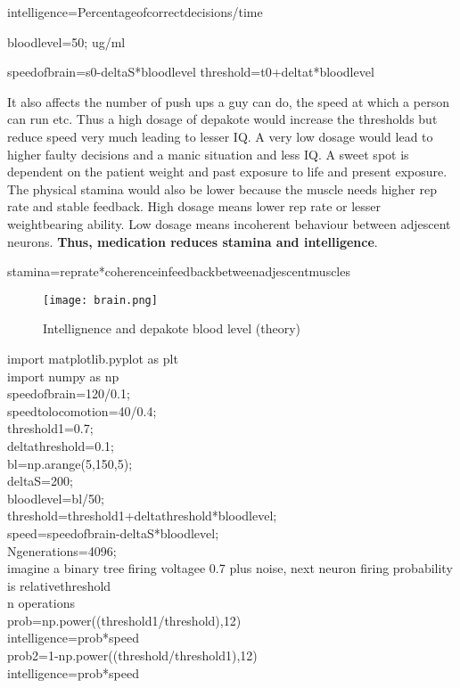 \documentclass[a4paper]{article}
\begin{document}
intelligence=Percentageofcorrectdecisions/time

bloodlevel=50; ug/ml

speedofbrain=s0-deltaS*bloodlevel
threshold=t0+deltat*bloodlevel

It also affects the number of push ups a guy can do, the speed at which  a person can run etc. Thus a high dosage of depakote would increase the thresholds but reduce speed very much leading to lesser IQ. A very low dosage would lead to higher faulty decisions and a manic situation and less IQ. A sweet spot is dependent on the patient weight and past exposure to life and present exposure. The physical stamina would also be lower because the muscle needs higher rep rate and stable feedback. High dosage means lower rep rate or lesser weightbearing ability. Low dosage means incoherent behaviour between adjescent neurons. \textbf{Thus, medication reduces stamina and intelligence}.

stamina=reprate*coherenceinfeedbackbetweenadjescentmuscles

 

\begin{figure}
\centering
\texttt{[image: brain.png]}
\caption{\label{fig:Lorenz}Intellignence and depakote blood level (theory)}
\end{figure}

import matplotlib.pyplot as plt\\
import numpy as np\\
speedofbrain=120/0.1;\\
speedtolocomotion=40/0.4;\\
threshold1=0.7;\\
deltathreshold=0.1;\\
bl=np.arange(5,150,5);\\
deltaS=200;\\
bloodlevel=bl/50;\\
threshold=threshold1+deltathreshold*bloodlevel;\\
speed=speedofbrain-deltaS*bloodlevel;\\
Ngenerations=4096;\\

imagine a binary tree firing voltagee 0.7 plus noise, next neuron firing probability is relativethreshold\\
n operations\\

prob=np.power((threshold1/threshold),12)\\
intelligence=prob*speed\\
prob2=1-np.power((threshold/threshold1),12)\\
intelligence=prob*speed\\
\end{document}
